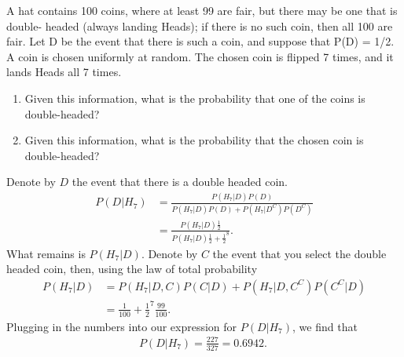 

\setcounter{theorem}{4}

\begin{exercise} [BH.2.7] 
A hat contains 100 coins, where at least 99 are fair, but there may be one that is double- headed (always landing Heads); if there is no such coin, then all 100 are fair. Let D be the event that there is such a coin, and suppose that P(D) = 1/2. A coin is chosen uniformly at random. The chosen coin is flipped 7 times, and it lands Heads all 7 times.
	\begin{enumerate}
		\item Given this information, what is the probability that one of the coins is double-headed?
		\item Given this information, what is the probability that the chosen coin is double-headed?
	\end{enumerate}
	\begin{solution}
	 	Denote by $D$ the event that there is a double headed coin. 
	\begin{align*}
		P(D|H_{7})& = \frac{P(H_{7}|D)P(D)}{P(H_{7}|D)P(D) + P(H_{7}|D^{C})P(D^{C})}\\
		&=\frac{P(H_{7}|D)\frac{1}{2}}{P(H_{7}|D)\frac{1}{2} + \frac{1}{2}^8}.
	\end{align*}
	What remains is $P(H_{7}|D)$. Denote by $C$ the event that you select the double headed coin, then, using the law of total probability
	\begin{align*}
		P(H_{7}|D) &=P(H_{7}|D,C)P(C|D) + P(H_{7}|D,C^{C})P(C^{C}|D)\\
		& = \frac{1}{100} + \frac{1}{2}^7\frac{99}{100}.
	\end{align*}
	Plugging in the numbers into our expression for $P(D|H_{7})$, we find that
	\begin{align*}
		P(D|H_{7}) = \frac{227}{327} = 0.6942.\
	\end{align*}
\end{solution}
\end{exercise}


